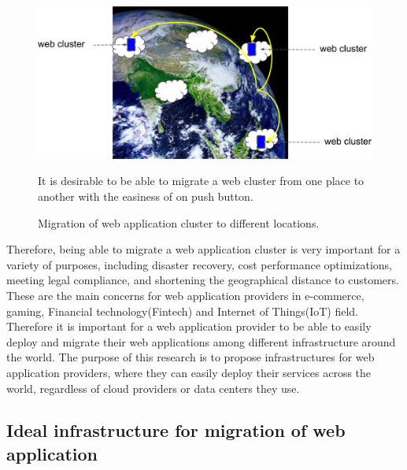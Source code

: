 \begin{figure}[h]
\begin{center}
\includegraphics[width=0.7\columnwidth]{Figs/earth}
\end{center}
\caption{
Migration of web application cluster to different locations.
}
\centering\parbox[c]{0.9\columnwidth}{
It is desirable to be able to migrate a web cluster from one place to another with the easiness of on push button.
}
\label{fig:earth}
\end{figure}

Therefore, being able to migrate a web application cluster is very important for a variety of purposes, including disaster recovery, cost performance optimizations, meeting legal compliance, and shortening the geographical distance to customers.
These are the main concerns for web application providers in e-commerce, gaming, Financial technology(Fintech) and Internet of Things(IoT) field.
Therefore it is important for a web application provider to be able to easily deploy and migrate their web applications among different infrastructure around the world.
The purpose of this research is to propose infrastructures for web application providers, where they can easily deploy their services across the world, regardless of cloud providers or data centers they use.


\subsection{Ideal infrastructure for migration of web application}

